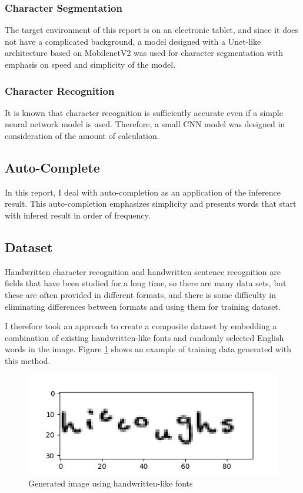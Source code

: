\subsubsection{Character Segmentation}

The target environment of this report is on an electronic tablet,
and since it does not have a complicated background,
a model designed with a Unet-like~\cite{ronneberger2015unet} architecture based on MobilenetV2\cite{s2018mobilenetv2} was
used for character segmentation with emphasis on speed and simplicity of the model.

\subsubsection{Character Recognition}

It is known that character recognition is sufficiently accurate even if
a simple neural network model is used. Therefore, a small CNN model was designed
in consideration of the amount of calculation.

\subsection{Auto-Complete}

In this report, I deal with auto-completion as an application of the inference result.
This auto-completion emphasizes simplicity and presents words
that start with infered result in order of frequency.

\subsection{Dataset}

Handwritten character recognition and handwritten sentence recognition are
fields that have been studied for a long time, so there are many data sets,
but these are often provided in different formats, and there is some difficulty
in eliminating differences between formats and using them for training dataset.

I therefore took an approach to create a composite dataset by
embedding a combination of existing handwritten-like fonts and
randomly selected English words in the image.
Figure \ref{fig:generated_image} shows an example of training data generated with this method.

\begin{figure}
    \centering
    \includegraphics[width=\linewidth]{images/generated_image.png}
    \caption{Generated image using handwritten-like fonts}
    \label{fig:generated_image}
\end{figure}

